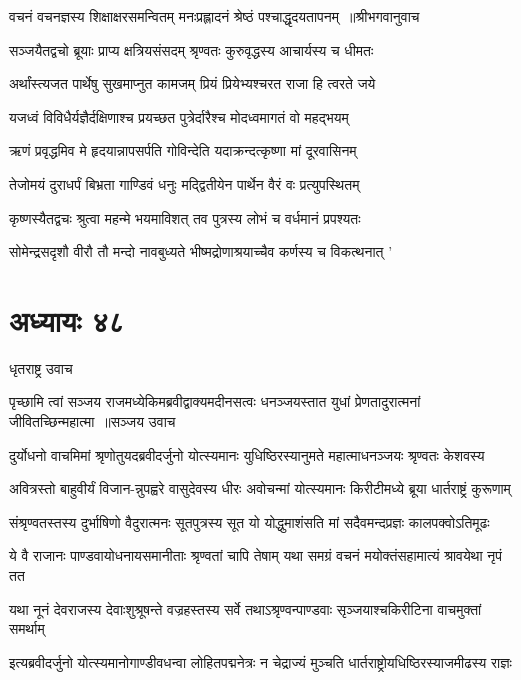 \threelineshloka
{वचनं वचनज्ञस्य शिक्षाक्षरसमन्वितम्}
{मनःप्रह्लादनं श्रेष्ठं पश्चाद्धृदयतापनम् ॥श्रीभगवानुवाच}
{}


\twolineshloka
{सञ्जयैतद्वचो ब्रूयाः प्राप्य क्षत्रियसंसदम्}
{श्रृण्वतः कुरुवृद्धस्य आचार्यस्य च धीमतः}


\twolineshloka
{अर्थांस्त्यजत पार्थेषु सुखमाप्नुत कामजम्}
{प्रियं प्रियेभ्यश्चरत राजा हि त्वरते जये}


\twolineshloka
{यजध्वं विविधैर्यज्ञैर्दक्षिणाश्च प्रयच्छत}
{पुत्रेर्दारैश्च मोदध्वमागतं वो महद्भयम्}


\twolineshloka
{ऋणं प्रवृद्धमिव मे हृदयान्नापसर्पति}
{गोविन्देति यदाक्रन्दत्कृष्णा मां दूरवासिनम्}


\twolineshloka
{तेजोमयं दुराधर्पं बिभ्रता गाण्डिवं धनुः}
{मद्द्वितीयेन पार्थेन वैरं वः प्रत्युपस्थितम्}


\twolineshloka
{कृष्णस्यैतद्वचः श्रुत्वा महन्मे भयमाविशत्}
{तव पुत्रस्य लोभं च वर्धमानं प्रपश्यतः}


\twolineshloka
{सोमेन्द्रसदृशौ वीरौ तौ मन्दो नावबुध्यते}
{भीष्मद्रोणाश्रयाच्चैव कर्णस्य च विकत्थनात् '}


\chapter{अध्यायः ४८}
\twolineshloka
{धृतराष्ट्र उवाच}
{}


\threelineshloka
{पृच्छामि त्वां सञ्जय राजमध्येकिमब्रवीद्वाक्यमदीनसत्वः}
{धनञ्जयस्तात युधां प्रेणतादुरात्मनां जीवितच्छिन्महात्मा ॥सञ्जय उवाच}
{}


\twolineshloka
{दुर्योधनो वाचमिमां श्रृणोतुयदब्रवीदर्जुनो योत्स्यमानः}
{युधिष्ठिरस्यानुमते महात्माधनञ्जयः श्रृण्वतः केशवस्य}


\twolineshloka
{अवित्रस्तो बाहुवीर्यं विजान-न्नुपह्वरे वासुदेवस्य धीरः}
{अवोचन्मां योत्स्यमानः किरीटीमध्ये ब्रूया धार्तराष्ट्रं कुरूणाम्}


\twolineshloka
{संश्रृण्वतस्तस्य दुर्भाषिणो वैदुरात्मनः सूतपुत्रस्य सूत}
{यो योद्धुमाशंसति मां सदैवमन्दप्रज्ञः कालपक्वोऽतिमूढः}


\twolineshloka
{ये वै राजानः पाण्डवायोधनायसमानीताः श्रृण्वतां चापि तेषाम्}
{यथा समग्रं वचनं मयोक्तंसहामात्यं श्रावयेथा नृपं तत}


\twolineshloka
{यथा नूनं देवराजस्य देवाःशुश्रूषन्ते वज्रहस्तस्य सर्वे}
{तथाऽश्रृण्वन्पाण्डवाः सृञ्जयाश्चकिरीटिना वाचमुक्तां समर्थाम्}


\twolineshloka
{इत्यब्रवीदर्जुनो योत्स्यमानोगाण्डीवधन्वा लोहितपद्मनेत्रः}
{न चेद्राज्यं मुञ्चति धार्तराष्ट्रोयधिष्ठिरस्याजमीढस्य राज्ञः}


